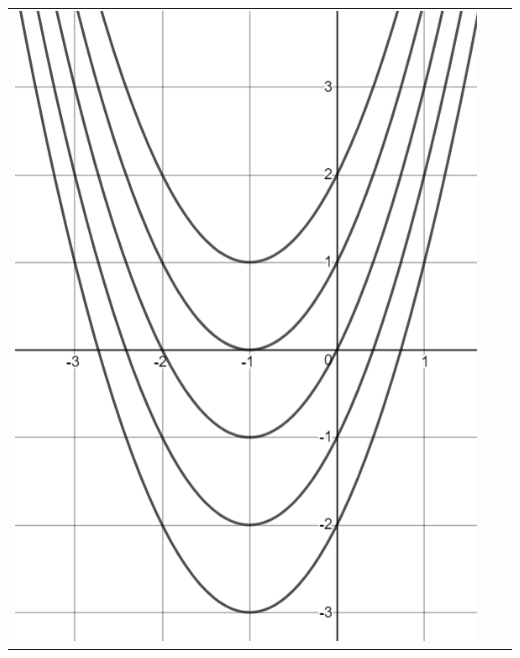 \documentclass[12pt,letterpaper]{article}
\begin{document}
\begin{center}
\begin{tabular}{lcl}
\includegraphics[scale=0.5]{math180_sec5_4_img1.png} & \hspace{30pt} & 

\end{tabular}
\end{center}
\end{document}

